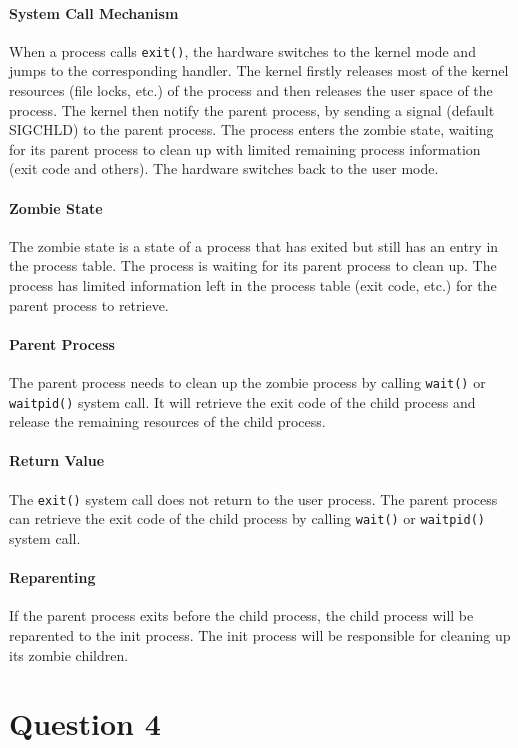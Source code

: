 \documentclass[a4paper,12pt]{article}
\begin{document}
\paragraph{System Call Mechanism} When a process calls \texttt{exit()}, the hardware switches to the kernel mode and jumps to the corresponding handler. The kernel firstly releases most of the kernel resources (file locks, etc.) of the process and then releases the user space of the process. The kernel then notify the parent process, by sending a signal (default SIGCHLD) to the parent process. The process enters the zombie state, waiting for its parent process to clean up with limited remaining process information (exit code and others). The hardware switches back to the user mode.

\paragraph{Zombie State} The zombie state is a state of a process that has exited but still has an entry in the process table. The process is waiting for its parent process to clean up. The process has limited information left in the process table (exit code, etc.) for the parent process to retrieve.

\paragraph{Parent Process} The parent process needs to clean up the zombie process by calling \texttt{wait()} or \texttt{waitpid()} system call. It will retrieve the exit code of the child process and release the remaining resources of the child process.

\paragraph{Return Value} The \texttt{exit()} system call does not return to the user process. The parent process can retrieve the exit code of the child process by calling \texttt{wait()} or \texttt{waitpid()} system call.

\paragraph{Reparenting} If the parent process exits before the child process, the child process will be reparented to the init process. The init process will be responsible for cleaning up its zombie children.

\section*{Question 4}
\end{document}
